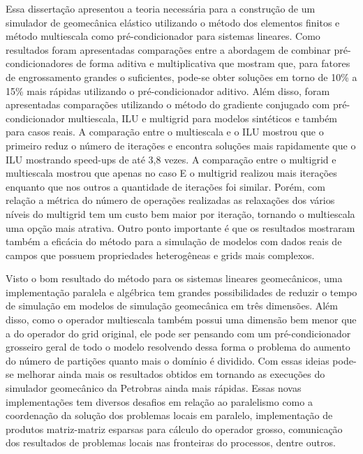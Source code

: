
Essa dissertação apresentou a teoria necessária para a construção de um simulador de geomecânica elástico utilizando o método dos elementos finitos e método multiescala como pré-condicionador para sistemas lineares. Como resultados foram apresentadas comparações entre a abordagem de combinar pré-condicionadores de forma aditiva e multiplicativa que mostram que, para fatores de engrossamento grandes o suficientes, pode-se obter soluções em torno de 10\% a 15\%  mais rápidas utilizando o pré-condicionador aditivo. Além disso, foram apresentadas comparações utilizando o método do gradiente conjugado com pré-condicionador  multiescala, ILU e multigrid para modelos sintéticos e também para casos reais. A comparação entre o multiescala e o ILU mostrou que o primeiro reduz o número de iterações e encontra soluções mais rapidamente que o ILU mostrando speed-ups de até 3,8 vezes. A comparação entre o multigrid e multiescala mostrou que apenas no caso E o multigrid realizou mais iterações enquanto que nos outros a quantidade de iterações foi similar. Porém, com relação a métrica do número de operações realizadas as relaxações dos vários níveis do multigrid  tem um custo bem maior por iteração, tornando o multiescala uma opção mais atrativa.  Outro ponto importante é que os resultados mostraram também a eficácia do método para a simulação de modelos com dados reais de campos que possuem propriedades heterogêneas e grids mais complexos. 

Visto o bom resultado do método para os sistemas lineares geomecânicos, uma implementação paralela e algébrica tem grandes possibilidades de reduzir o tempo de simulação em modelos de simulação geomecânica em três dimensões. Além disso, como o operador multiescala também possui uma dimensão bem menor que a do operador do grid original, ele pode ser pensando com um pré-condicionador grosseiro geral de todo o modelo resolvendo dessa forma o problema do aumento do número de partições quanto mais o domínio é dividido. Com essas ideias pode-se melhorar ainda mais os resultados obtidos em \citet{geomecrio} tornando as execuções do simulador geomecânico da Petrobras ainda mais rápidas. Essas novas implementações tem diversos desafios em relação ao paralelismo como a coordenação da solução dos problemas locais em paralelo, implementação de produtos matriz-matriz esparsas para  cálculo do operador grosso, comunicação dos resultados de problemas locais nas fronteiras do processos, dentre outros.


